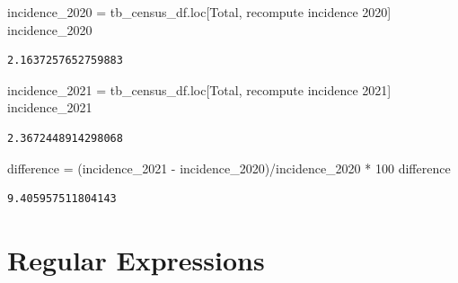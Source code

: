 \documentclass[
  letterpaper,
  DIV=11,
  numbers=noendperiod]{scrreprt}
\newenvironment{Shaded}{\begin{snugshade}}{\end{snugshade}}
\newcommand{\DecValTok}[1]{\textcolor[rgb]{0.68,0.00,0.00}{#1}}
\newcommand{\NormalTok}[1]{\textcolor[rgb]{0.00,0.23,0.31}{#1}}
\newcommand{\OperatorTok}[1]{\textcolor[rgb]{0.37,0.37,0.37}{#1}}
\newcommand{\StringTok}[1]{\textcolor[rgb]{0.13,0.47,0.30}{#1}}
\begin{document}
\begin{Shaded}
\begin{Highlighting}[]
\NormalTok{incidence\_2020 }\OperatorTok{=}\NormalTok{ tb\_census\_df.loc[}\StringTok{\textquotesingle{}Total\textquotesingle{}}\NormalTok{, }\StringTok{\textquotesingle{}recompute incidence 2020\textquotesingle{}}\NormalTok{]}
\NormalTok{incidence\_2020}
\end{Highlighting}
\end{Shaded}

\begin{verbatim}
2.1637257652759883
\end{verbatim}

\begin{Shaded}
\begin{Highlighting}[]
\NormalTok{incidence\_2021 }\OperatorTok{=}\NormalTok{ tb\_census\_df.loc[}\StringTok{\textquotesingle{}Total\textquotesingle{}}\NormalTok{, }\StringTok{\textquotesingle{}recompute incidence 2021\textquotesingle{}}\NormalTok{]}
\NormalTok{incidence\_2021}
\end{Highlighting}
\end{Shaded}

\begin{verbatim}
2.3672448914298068
\end{verbatim}

\begin{Shaded}
\begin{Highlighting}[]
\NormalTok{difference }\OperatorTok{=}\NormalTok{ (incidence\_2021 }\OperatorTok{{-}}\NormalTok{ incidence\_2020)}\OperatorTok{/}\NormalTok{incidence\_2020 }\OperatorTok{*} \DecValTok{100}
\NormalTok{difference}
\end{Highlighting}
\end{Shaded}

\begin{verbatim}
9.405957511804143
\end{verbatim}


\hypertarget{regular-expressions}{%
\chapter{Regular Expressions}\label{regular-expressions}}
\end{document}
